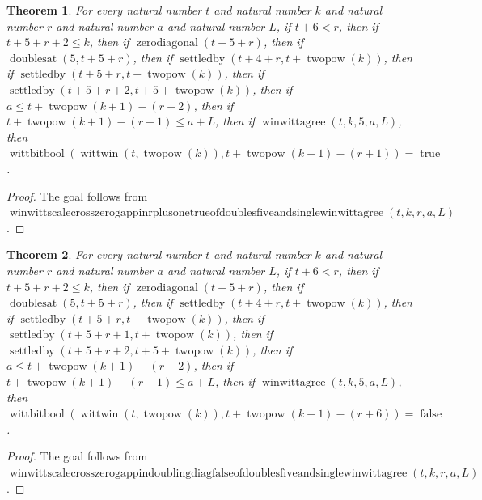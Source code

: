 \documentclass[11pt]{article}
\newtheorem{theorem}{Theorem}[section]
\theoremstyle{definition}
\begin{document}
\begin{theorem}
\label{ll:paper:winwitt-scale-cross-zero-gap-pin-r-plus-one-true-of-doubles-five-and-single-winwittagree}
For every natural number \(t\) and natural number \(k\) and natural number \(r\) and natural number \(a\) and natural number \(L\), if \(t + 6 < r\), then if \(t + 5 + r + 2 \le k\), then if \(\operatorname{zerodiagonal}(t + 5 + r)\), then if \(\operatorname{doublesat}(5, t + 5 + r)\), then if \(\operatorname{settledby}(t + 4 + r, t + \operatorname{twopow}(k))\), then if \(\operatorname{settledby}(t + 5 + r, t + \operatorname{twopow}(k))\), then if \(\operatorname{settledby}(t + 5 + r + 2, t + 5 + \operatorname{twopow}(k))\), then if \(a \le t + \operatorname{twopow}(k + 1) - (r + 2)\), then if \(t + \operatorname{twopow}(k + 1) - (r - 1) \le a + L\), then if \(\operatorname{winwittagree}(t, k, 5, a, L)\), then \(\operatorname{wittbitbool}(\operatorname{wittwin}(t, \operatorname{twopow}(k)), t + \operatorname{twopow}(k + 1) - (r + 1)) = \operatorname{true}\).
\end{theorem}
\begin{proof}
The goal follows from \(\operatorname{winwittscalecrosszerogappinrplusonetrueofdoublesfiveandsinglewinwittagree}(t, k, r, a, L)\).
\end{proof}
\begin{theorem}
\label{ll:paper:winwitt-scale-cross-zero-gap-pin-doubling-diag-false-of-doubles-five-and-single-winwittagree}
For every natural number \(t\) and natural number \(k\) and natural number \(r\) and natural number \(a\) and natural number \(L\), if \(t + 6 < r\), then if \(t + 5 + r + 2 \le k\), then if \(\operatorname{zerodiagonal}(t + 5 + r)\), then if \(\operatorname{doublesat}(5, t + 5 + r)\), then if \(\operatorname{settledby}(t + 4 + r, t + \operatorname{twopow}(k))\), then if \(\operatorname{settledby}(t + 5 + r, t + \operatorname{twopow}(k))\), then if \(\operatorname{settledby}(t + 5 + r + 1, t + \operatorname{twopow}(k))\), then if \(\operatorname{settledby}(t + 5 + r + 2, t + 5 + \operatorname{twopow}(k))\), then if \(a \le t + \operatorname{twopow}(k + 1) - (r + 2)\), then if \(t + \operatorname{twopow}(k + 1) - (r - 1) \le a + L\), then if \(\operatorname{winwittagree}(t, k, 5, a, L)\), then \(\operatorname{wittbitbool}(\operatorname{wittwin}(t, \operatorname{twopow}(k)), t + \operatorname{twopow}(k + 1) - (r + 6)) = \operatorname{false}\).
\end{theorem}
\begin{proof}
The goal follows from \(\operatorname{winwittscalecrosszerogappindoublingdiagfalseofdoublesfiveandsinglewinwittagree}(t, k, r, a, L)\).
\end{proof}
\end{document}
